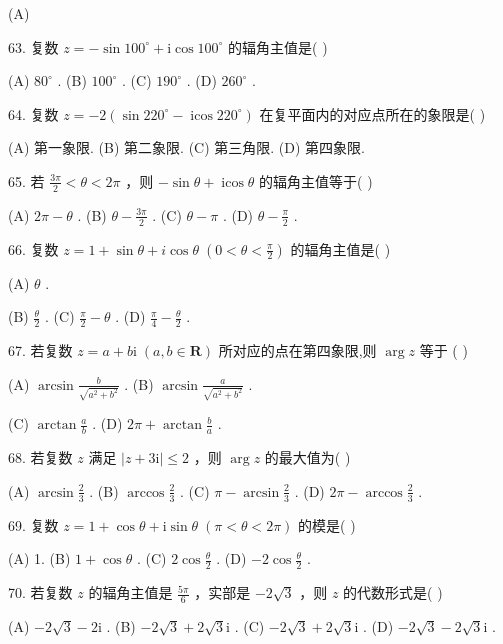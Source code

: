 \documentclass[10pt]{article}
\begin{document}
(A)

63. 复数 \(z =  - \sin {100}^{ \circ  } + \mathrm{i}\cos {100}^{ \circ  }\) 的辐角主值是( )

(A) \({80}^{ \circ  }\) . (B) \({100}^{ \circ  }\) . (C) \({190}^{ \circ  }\) . (D) \({260}^{ \circ  }\) .

64. 复数 \(z =  - 2\left( {\sin {220}^{ \circ  } - \operatorname{icos}{220}^{ \circ  }}\right)\) 在复平面内的对应点所在的象限是( )

(A) 第一象限. (B) 第二象限. (C) 第三角限. (D) 第四象限.

65. 若 \(\frac{3\pi }{2} < \theta  < {2\pi }\) ，则 \(- \sin \theta  + \operatorname{icos}\theta\) 的辐角主值等于( )

(A) \({2\pi } - \theta\) . (B) \(\theta  - \frac{3\pi }{2}\) . (C) \(\theta  - \pi\) . (D) \(\theta  - \frac{\pi }{2}\) .

66. 复数 \(z = 1 + \sin \theta  + i\cos \theta \;\left( {0 < \theta  < \frac{\pi }{2}}\right)\) 的辐角主值是( )

(A) \(\theta\) .

(B) \(\frac{\theta }{2}\) . (C) \(\frac{\pi }{2} - \theta\) . (D) \(\frac{\pi }{4} - \frac{\theta }{2}\) .

67. 若复数 \(z = a + b\mathrm{i}\;\left( {a,b \in  \mathbf{R}}\right)\) 所对应的点在第四象限,则 \(\arg z\) 等于 ( )

(A) \(\arcsin \frac{b}{\sqrt{{a}^{2} + {b}^{2}}}\) . (B) \(\arcsin \frac{a}{\sqrt{{a}^{2} + {b}^{2}}}\) .

(C) \(\arctan \frac{a}{b}\) . (D) \({2\pi } + \arctan \frac{b}{a}\) .

68. 若复数 \(z\) 满足 \(\left| {z + 3\mathrm{i}}\right|  \leq  2\) ，则 \(\arg z\) 的最大值为( )

(A) \(\arcsin \frac{2}{3}\) . (B) \(\arccos \frac{2}{3}\) . (C) \(\pi  - \arcsin \frac{2}{3}\) . (D) \({2\pi } - \arccos \frac{2}{3}\) .

69. 复数 \(z = 1 + \cos \theta  + \mathrm{i}\sin \theta \;\left( {\pi  < \theta  < {2\pi }}\right)\) 的模是( )

(A) 1. (B) \(1 + \cos \theta\) . (C) \(2\cos \frac{\theta }{2}\) . (D) \(- 2\cos \frac{\theta }{2}\) .

70. 若复数 \(z\) 的辐角主值是 \(\frac{5\pi }{6}\) ，实部是 \(- 2\sqrt{3}\) ，则 \(z\) 的代数形式是( )

(A) \(- 2\sqrt{3} - 2\mathrm{i}\) . (B) \(- 2\sqrt{3} + 2\sqrt{3}\mathrm{i}\) . (C) \(- 2\sqrt{3} + 2\sqrt{3}\mathrm{i}\) . (D) \(- 2\sqrt{3} - 2\sqrt{3}\mathrm{i}\) .
\end{document}

